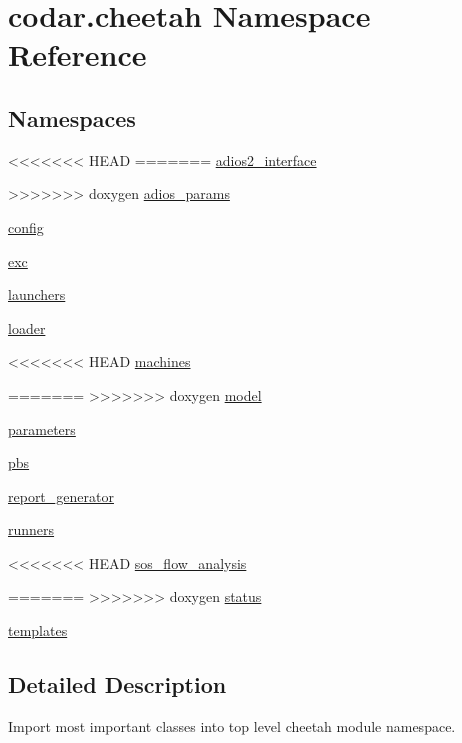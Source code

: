 \hypertarget{namespacecodar_1_1cheetah}{}\section{codar.\+cheetah Namespace Reference}
\label{namespacecodar_1_1cheetah}
\subsection*{Namespaces}
\begin{DoxyCompactItemize}
\item 
<<<<<<< HEAD
=======
 \hyperlink{namespacecodar_1_1cheetah_1_1adios2__interface}{adios2\+\_\+interface}
\item 
>>>>>>> doxygen
 \hyperlink{namespacecodar_1_1cheetah_1_1adios__params}{adios\+\_\+params}
\item 
 \hyperlink{namespacecodar_1_1cheetah_1_1config}{config}
\item 
 \hyperlink{namespacecodar_1_1cheetah_1_1exc}{exc}
\item 
 \hyperlink{namespacecodar_1_1cheetah_1_1launchers}{launchers}
\item 
 \hyperlink{namespacecodar_1_1cheetah_1_1loader}{loader}
\item 
<<<<<<< HEAD
 \hyperlink{namespacecodar_1_1cheetah_1_1machines}{machines}
\item 
=======
>>>>>>> doxygen
 \hyperlink{namespacecodar_1_1cheetah_1_1model}{model}
\item 
 \hyperlink{namespacecodar_1_1cheetah_1_1parameters}{parameters}
\item 
 \hyperlink{namespacecodar_1_1cheetah_1_1pbs}{pbs}
\item 
 \hyperlink{namespacecodar_1_1cheetah_1_1report__generator}{report\+\_\+generator}
\item 
 \hyperlink{namespacecodar_1_1cheetah_1_1runners}{runners}
\item 
<<<<<<< HEAD
 \hyperlink{namespacecodar_1_1cheetah_1_1sos__flow__analysis}{sos\+\_\+flow\+\_\+analysis}
\item 
=======
>>>>>>> doxygen
 \hyperlink{namespacecodar_1_1cheetah_1_1status}{status}
\item 
 \hyperlink{namespacecodar_1_1cheetah_1_1templates}{templates}
\end{DoxyCompactItemize}


\subsection{Detailed Description}
\begin{DoxyVerb}Import most important classes into top level cheetah module namespace.
\end{DoxyVerb}
 